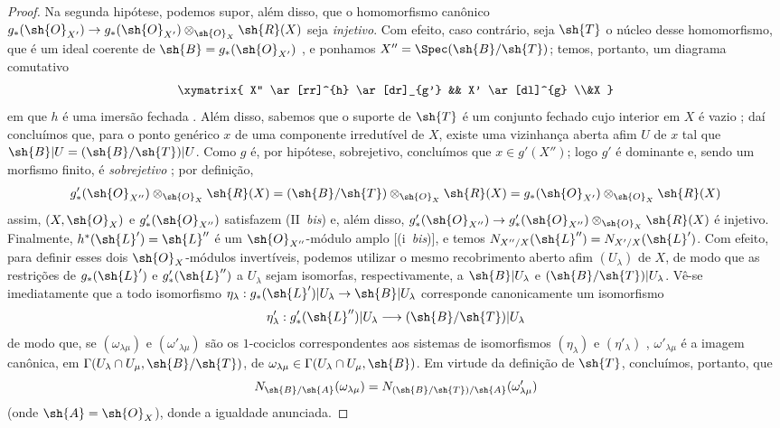 \documentclass[oneside,10pt]{amsart}
\makeatletter
\newcommand{\ega@arrow}[2]{\mathchoice{#1}{#2}{#2}{#2}}
\renewcommand{\to}{\ega@arrow{\longrightarrow}{\rightarrow}}
\newcommand{\oldpage}[2][]{\marginnote{\normalfont\footnotesize\textbf{#1}~|~#2}\ignorespaces}
\makeatother
\begin{document}
\begin{proof}
Na segunda hipótese, podemos supor, além disso, que o homomorfismo canônico $g_*(\sh{O}_{X'})\to g_*(\sh{O}_{X'})\otimes_{\sh{O}_X}\sh{R}(X)$ seja \emph{injetivo}.
Com efeito, caso contrário, seja $\sh{T}$
\oldpage[II]{131}
o núcleo desse homomorfismo, que é um ideal coerente de $\sh{B}=g_*(\sh{O}_{X'})$ , e ponhamos $X''=\Spec(\sh{B}/\sh{T})$;
temos, portanto, um diagrama comutativo
\[
  \xymatrix{
    X'' \ar[rr]^{h} \ar[dr]_{g'}
    && X' \ar[dl]^{g}
  \\&X
  }
\]
em que $h$ é uma imersão fechada .
Além disso, sabemos que o suporte de $\sh{T}$ é um conjunto fechado  cujo interior em $X$ é vazio ; daí concluímos que, para o ponto genérico $x$ de uma componente irredutível de $X$, existe uma vizinhança aberta afim $U$ de $x$ tal que $\sh{B}|U=(\sh{B}/\sh{T})|U$.
Como $g$ é, por hipótese, sobrejetivo, concluímos que $x\in g'(X'')$;
logo $g'$ é dominante e, sendo um morfismo finito, é \emph{sobrejetivo} ;
por definição,
\[
  g'_*(\sh{O}_{X''})\otimes_{\sh{O}_X}\sh{R}(X)
  = (\sh{B}/\sh{T})\otimes_{\sh{O}_X}\sh{R}(X)
  = g_*(\sh{O}_{X'})\otimes_{\sh{O}_X}\sh{R}(X)
\]
assim, $(X,\sh{O}_X)$ e $g'_*(\sh{O}_{X''})$ satisfazem (II~\emph{bis}) e, além disso, $g'_*(\sh{O}_{X''})\to g'_*(\sh{O}_{X''})\otimes_{\sh{O}_X}\sh{R}(X)$ é injetivo.
Finalmente, $h^*(\sh{L}')=\sh{L}''$ é um $\sh{O}_{X''}$-módulo amplo [(i~\emph{bis})], e temos $N_{X''/X}(\sh{L}'')=N_{X'/X}(\sh{L}')$.
Com efeito, para definir esses dois $\sh{O}_X$-módulos invertíveis, podemos utilizar o mesmo recobrimento aberto afim $(U_\lambda)$ de $X$, de modo que as restrições de $g_*(\sh{L}')$ e $g'_*(\sh{L}'')$ a $U_\lambda$ sejam isomorfas, respectivamente, a $\sh{B}|U_\lambda$ e $(\sh{B}/\sh{T})|U_\lambda$.
Vê-se imediatamente que a todo isomorfismo $\eta_\lambda:g_*(\sh{L}')|U_\lambda\to\sh{B}|U_\lambda$ corresponde canonicamente um isomorfismo
\[
  \eta'_\lambda : g'_*(\sh{L}'')|U_\lambda \to (\sh{B}/\sh{T})|U_\lambda
\]
de modo que, se $(\omega_{\lambda\mu})$ e $(\omega'_{\lambda\mu})$ são os $1$-cociclos correspondentes aos sistemas de isomorfismos $(\eta_\lambda)$ e $(\eta'_\lambda)$ , $\omega'_{\lambda\mu}$ é a imagem canônica, em $\Gamma(U_\lambda\cap U_\mu,\sh{B}/\sh{T})$, de $\omega_{\lambda\mu}\in\Gamma(U_\lambda\cap U_\mu,\sh{B})$.
Em virtude da definição de $\sh{T}$, concluímos, portanto, que
\[
  N_{\sh{B}/\sh{A}}(\omega_{\lambda\mu}) = N_{(\sh{B}/\sh{T})/\sh{A}}(\omega'_{\lambda\mu})
\]
(onde $\sh{A}=\sh{O}_X$), donde a igualdade anunciada.


\end{proof}
\end{document}
